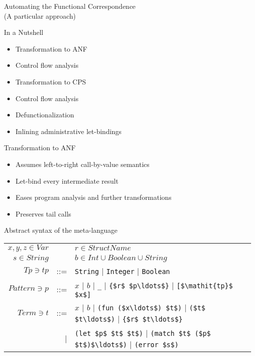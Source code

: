 \documentclass{beamer}
\begin{document}
\begin{frame}
  \begin{center}
    \LARGE{Automating the Functional Correspondence}\\
    \tiny{(A particular approach)}
  \end{center}
\end{frame}

\begin{frame}{In a Nutshell}
  \begin{itemize}
    \item Transformation to ANF \pause
    \item Control flow analysis \pause
    \item Transformation to CPS \pause
    \item Control flow analysis \pause
    \item Defunctionalization \pause
    \item Inlining administrative let-bindings
  \end{itemize}
\end{frame}

\begin{frame}[fragile]{Transformation to ANF}
  \begin{itemize}
    \item Assumes left-to-right call-by-value semantics
    \item Let-bind every intermediate result \pause
    \item Eases program analysis and further transformations \pause
    \item Preserves tail calls \pause
  \end{itemize}\pause
  \vspace{1\baselineskip}
  \begin{beamerboxesrounded}{Abstract syntax of the meta-language}
  \begin{center}
    \begingroup
    \setlength{\tabcolsep}{2pt}
    \def\arraystretch{1.3}
    \begin{tabular}{rrl}
      $x, y, z \in Var$ && $r\in StructName$\\
      $s \in String$ && $b \in Int \cup Boolean \cup String$\\
      $Tp \ni \mathit{tp} $ &::=& \lstinline!String! | \lstinline!Integer! | \lstinline!Boolean!\\
      $Pattern \ni p $ &::=& $x$ | $b$ | \lstinline!_! | \lstinline!{$r$ $p\ldots$}! |  \lstinline![$\mathit{tp}$ $x$]!\\
      $Term \ni t$ &::=& $x$ | $b$
                  | \lstinline!(fun ($x\ldots$) $t$)!
                  | \lstinline!($t$ $t\ldots$)!
                  | \lstinline!{$r$ $t\ldots$}!\\
                  &|& \lstinline!(let $p$ $t$ $t$)!
                  | \lstinline!(match $t$ ($p$ $t$)$\ldots$)!
                  | \lstinline!(error $s$)!
    \end{tabular}
    \endgroup
    \end{center}
  \end{beamerboxesrounded}
\end{frame}
\end{document}
